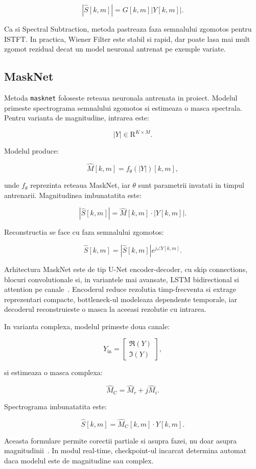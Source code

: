 \[
|\hat{S}[k,m]| = G[k,m]|Y[k,m]|.
\]

Ca si Spectral Subtraction, metoda pastreaza faza semnalului zgomotos pentru
ISTFT. In practica, Wiener Filter este stabil si rapid, dar poate lasa mai mult
zgomot rezidual decat un model neuronal antrenat pe exemple variate.

\subsection{MaskNet}

Metoda \texttt{masknet} foloseste reteaua neuronala antrenata in proiect.
Modelul primeste spectrograma semnalului zgomotos si estimeaza o masca spectrala.
Pentru varianta de magnitudine, intrarea este:

\[
|Y| \in \mathrm{R}^{K \times M}.
\]

Modelul produce:

\[
\hat{M}[k,m] = f_{\theta}(|Y|)[k,m],
\]

unde \(f_{\theta}\) reprezinta reteaua MaskNet, iar \(\theta\) sunt parametrii
invatati in timpul antrenarii. Magnitudinea imbunatatita este:

\[
|\hat{S}[k,m]| = \hat{M}[k,m] \cdot |Y[k,m]|.
\]

Reconstructia se face cu faza semnalului zgomotos:

\[
\hat{S}[k,m] =
|\hat{S}[k,m]|e^{j\angle Y[k,m]}.
\]

Arhitectura MaskNet este de tip U-Net encoder-decoder, cu skip connections,
blocuri convolutionale si, in variantele mai avansate, LSTM bidirectional si
attention pe canale~\cite{unet,lstm,se}. Encoderul reduce rezolutia
timp-frecventa si extrage reprezentari compacte, bottleneck-ul modeleaza
dependente temporale, iar decoderul reconstruieste o masca la aceeasi rezolutie
cu intrarea.

In varianta complexa, modelul primeste doua canale:

\[
Y_{\text{in}} =
\begin{bmatrix}
\Re(Y) \\
\Im(Y)
\end{bmatrix},
\]

si estimeaza o masca complexa:

\[
\hat{M}_{\mathrm{C}} =
\hat{M}_r + j\hat{M}_i.
\]

Spectrograma imbunatatita este:

\[
\hat{S}[k,m] =
\hat{M}_{\mathrm{C}}[k,m] \cdot Y[k,m].
\]

Aceasta formulare permite corectii partiale si asupra fazei, nu doar asupra
magnitudinii~\cite{complex_mask}. In modul real-time, checkpoint-ul incarcat
determina automat daca modelul este de magnitudine sau complex.

